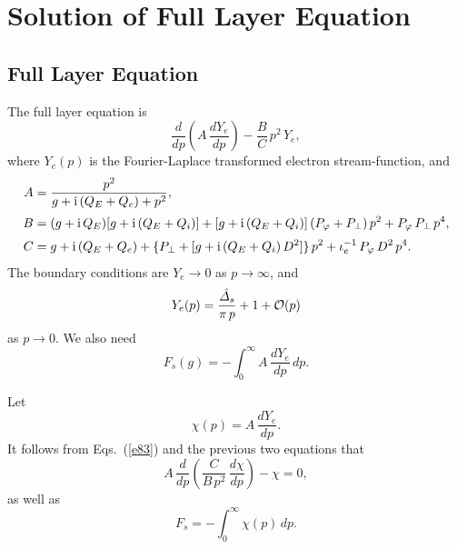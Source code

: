 \documentclass[titlepage=false,12pt]{article}
\begin{document}
\section{Solution of Full Layer Equation}
\subsection{Full Layer Equation}
The full layer equation is 
\begin{equation}\label{e83}
\frac{d}{dp}\!\left(A\,\frac{dY_e}{dp}\right) - \frac{B}{C}\,p^2\,Y_e,
\end{equation}
where $Y_e(p)$ is the Fourier-Laplace transformed electron stream-function, and
\begin{align}
A &= \frac{p^2}{g + {\rm i}\,(Q_E+Q_e) + p^2},\\[0.5ex]
B&=  (g+{\rm i}\,Q_E)[g+{\rm i}\,(Q_E+Q_i)] + [g+{\rm i}\,(Q_E+Q_i)]\,(P_\varphi+P_\perp)\,p^2+ P_\varphi\,P_\perp\,p^4,\\[0.5ex]
C&= g + {\rm i}\,(Q_E+Q_e) +\{P_\perp + [g+{\rm i}\,(Q_E+Q_i)\,D^2]\}\,p^2 + \iota_e^{-1}\,P_\varphi\,D^2\,p^4.
\end{align}
The boundary conditions are $Y_e\rightarrow 0$ as $p\rightarrow\infty$, and
\begin{equation}
Y_e(p) = \frac{\hat{\mit\Delta}_s}{\pi\,p}+ 1+{\cal O}(p)
\end{equation}
as $p\rightarrow 0$. We also need
\begin{equation}
F_s(g) = -\int_0^\infty A\,\frac{dY_e}{dp}\,dp.
\end{equation}

Let 
\begin{equation}\label{e89}
\chi(p) = A\,\frac{dY_e}{dp}.
\end{equation}
It follows from Eqs.~(\ref{e83}) and the previous two equations that
\begin{equation}\label{e90}
A\,\frac{d}{dp}\!\left(\frac{C}{B\,p^2}\,\frac{d\chi}{dp}\right) - \chi = 0,
\end{equation}
as well as
\begin{equation}
F_s= -\int_0^\infty \chi(p)\,dp.
\end{equation}
\end{document}

